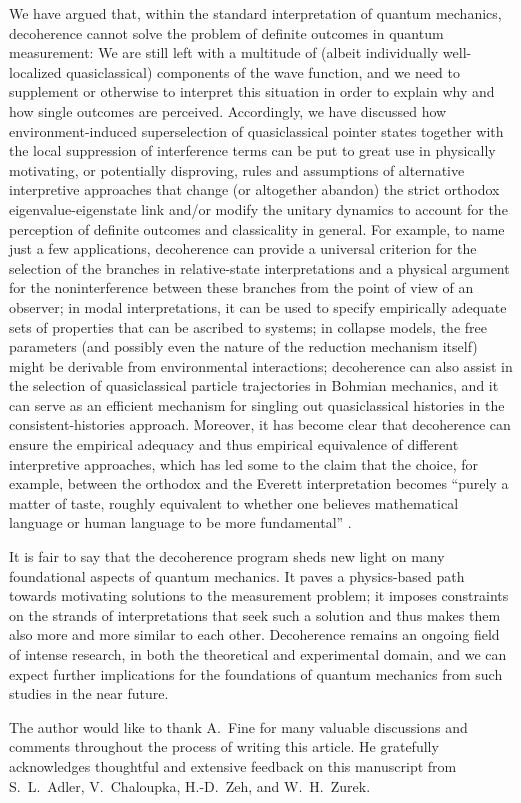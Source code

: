 \documentclass[rmp,aps,amsmath,amsfonts,noshowkeys,noshowpacs,12pt]{revtex4}
\begin{document}
We have argued that, within the standard interpretation of quantum
mechanics, decoherence cannot solve the problem of definite outcomes
in quantum measurement: We are still left with a multitude of (albeit
individually well-localized quasiclassical) components of the wave
function, and we need to supplement or otherwise to interpret this
situation in order to explain why and how single outcomes are
perceived. Accordingly, we have discussed how environment-induced
superselection of quasiclassical pointer states together with the
local suppression of interference terms can be put to great use in
physically motivating, or potentially disproving, rules and
assumptions of alternative interpretive approaches that change (or
altogether abandon) the strict orthodox eigenvalue-eigenstate link
and/or modify the unitary dynamics to account for the perception of
definite outcomes and classicality in general. For example, to name
just a few applications, decoherence can provide a universal criterion
for the selection of the branches in relative-state interpretations
and a physical argument for the noninterference between these branches
from the point of view of an observer; in modal interpretations, it
can be used to specify empirically adequate sets of properties that
can be ascribed to systems; in collapse models, the free parameters
(and possibly even the nature of the reduction mechanism itself) might
be derivable from environmental interactions; decoherence can also
assist in the selection of quasiclassical particle trajectories in
Bohmian mechanics, and it can serve as an efficient mechanism for
singling out quasiclassical histories in the consistent-histories
approach. Moreover, it has become clear that decoherence can ensure
the empirical adequacy and thus empirical equivalence of different
interpretive approaches, which has led some to the claim that the
choice, for example, between the orthodox and the Everett
interpretation becomes ``purely a matter of taste, roughly equivalent
to whether one believes mathematical language or human language to be
more fundamental'' \cite[p.~855]{Tegmark:1998:qq}.

It is fair to say that the decoherence program sheds new light on many
foundational aspects of quantum mechanics.  It paves a physics-based
path towards motivating solutions to the measurement problem; it
imposes constraints on the strands of interpretations that seek such a
solution and thus makes them also more and more similar to each other.
Decoherence remains an ongoing field of intense research, in both the
theoretical and experimental domain, and we can expect further
implications for the foundations of quantum mechanics from such
studies in the near future.


\begin{acknowledgments}

The author would like to thank A.~Fine for many valuable discussions
and comments throughout the process of writing this article.  He
gratefully acknowledges thoughtful and extensive feedback on this
manuscript from S.~L.~Adler, V.~Chaloupka, H.-D.~Zeh, and W.~H.~Zurek.

\end{acknowledgments}




\end{document}
